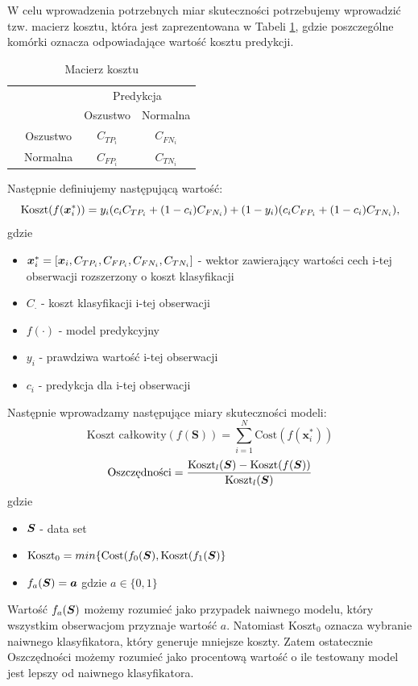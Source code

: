 \documentclass{book}
\begin{document}
	W celu wprowadzenia potrzebnych miar skuteczności potrzebujemy wprowadzić tzw. macierz kosztu, która jest zaprezentowana w Tabeli \ref{macierz-kosztu}, gdzie poszczególne komórki oznacza odpowiadające wartość kosztu predykcji. 
	\begin{table}[h]
		\begin{center}
			\makegapedcells
			\begin{tabular}{cc|cc}
				\multicolumn{2}{c}{}     &   \multicolumn{2}{c}{Predykcja} \\
				&            &   Oszustwo &   Normalna     \\ 
				\cline{2-4}
				\multirow{2}{*}{\rotatebox[origin=c]{90}{Prawda}} & Oszustwo   & $C_{TP_{i}}$         & $C_{FN_{i}}$              \\
				& Normalna   & $C_{FP_{i}}$         & $C_{TN_{i}}$              \\ 
				\cline{2-4}
			\end{tabular}
		\end{center}
		\caption{Macierz kosztu}
		\label{macierz-kosztu}
	\end{table}
	Następnie definiujemy następującą wartość:
	$$ \text{Koszt}(f(\boldsymbol{x}_{i}^{*})) = y_i (c_i C_{TP_i} + (1-c_i)C_{FN_i}) + (1-y_i)(c_i C_{FP_i} + (1-c_i)C_{TN_i}) \text{,}$$
	gdzie 
	\begin{itemize}
		\item $\boldsymbol{x}_{i}^{*} = [\boldsymbol{x}_i, C_{TP_{i}}, C_{FP_{i}}, C_{FN_{i}}, C_{TN_{i}}]$ - wektor zawierający wartości cech i-tej obserwacji rozszerzony o koszt klasyfikacji
		\item $C_{\cdot}$ - koszt klasyfikacji i-tej obserwacji
		\item $f(\cdot)$ - model predykcyjny
		\item $y_i$ - prawdziwa wartość i-tej obserwacji
		\item $c_i$ - predykcja dla i-tej obserwacji
	\end{itemize}{}
    Następnie wprowadzamy następujące miary skuteczności modeli:
	\begin{equation}
		\label{koszt-calkowity}
		\text{Koszt całkowity}(f(\boldsymbol{S})) = \sum_{i=1}^{N}\text{Cost}(f(\boldsymbol{x}_{i}^{*}))
	\end{equation} 
	\begin{equation}
		\text{Oszczędności} = \frac{\text{Koszt}_{l}(\boldsymbol{S}) - \text{Koszt}(f(\boldsymbol{S}))}{\text{Koszt}_{l}(\boldsymbol{S})}
	\end{equation}
	gdzie
	\begin{itemize}
		\item $ \boldsymbol{S} $ - data set
		\item $ \text{Koszt}_0 = min\{\text{Cost}(f_{0}(\boldsymbol{S}), \text{Koszt}(f_{1}(\boldsymbol{S})\} $
		\item $ f_{a}(\boldsymbol{S}) = \boldsymbol{a} $ gdzie $a \in \{0,1\}$
	\end{itemize}{}
	Wartość $ f_{a}(\boldsymbol{S})$ możemy rozumieć jako przypadek naiwnego modelu, który wszystkim obserwacjom przyznaje wartość $a$. Natomiast $ \text{Koszt}_0 $ oznacza wybranie naiwnego klasyfikatora, który generuje mniejsze koszty. Zatem ostatecznie Oszczędności możemy rozumieć jako procentową wartość o ile testowany model jest lepszy od naiwnego klasyfikatora.
	
\end{document}
